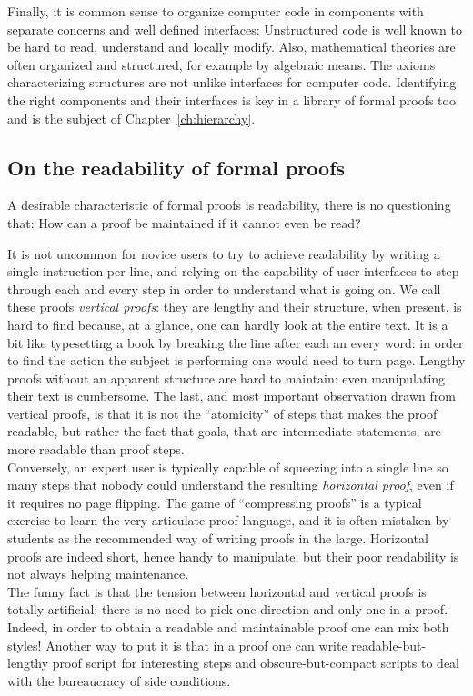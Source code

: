 Finally, it is common sense to organize computer code
in components with separate concerns and well defined interfaces:
Unstructured code is  well known to be hard to read, understand and
locally modify.
Also, mathematical theories are often organized and structured, for
example by algebraic means. The axioms characterizing structures
are not unlike interfaces for computer code.
Identifying the right components and their interfaces is key in a library of
formal proofs too and is the subject of Chapter~\ref{ch:hierarchy}.

\subsection{On the readability of formal proofs}

A desirable characteristic of formal proofs is readability,
there is no questioning that: How can a proof be maintained if
it cannot even be read?

It is not uncommon for novice users to try to achieve readability by
writing a single instruction per line, and relying on the capability
of user interfaces to step through each and every step in order to
understand what is going on. We call these proofs \emph{vertical proofs}:
they are lengthy
and their structure, when present, is hard to find
because, at a glance, one can hardly look at the entire text.
It is a bit like
typesetting a book by breaking the line after each an every word: in
order to find the action the subject is performing one would need to
turn page.  
Lengthy proofs without an apparent structure are hard to
maintain: even manipulating their text is cumbersome. The last, and
most important observation drawn from vertical proofs, is that it is
not the ``atomicity'' of steps that makes the proof readable, but
rather the fact that goals, that are intermediate statements, are
more readable than proof steps. \\
Conversely, an expert \mcbSSR{} user is typically capable of squeezing
into a single line so many steps that nobody could understand the
resulting \emph{horizontal proof}, even if it requires no page flipping.
The game of ``compressing proofs''
is a typical exercise to learn the very articulate \mcbSSR{} proof
language, and it is often
mistaken by students as the recommended way of writing proofs in the
large. Horizontal proofs are indeed short, hence handy to
manipulate, but their poor readability is not always helping maintenance.\\
The funny fact is that the tension between horizontal and vertical
proofs is totally artificial: there is no need to pick one direction and only
one in a proof. Indeed, in order to obtain a readable and maintainable proof
one can mix both styles! Another way to put it is that in a proof one
can write readable-but-lengthy proof script for interesting steps
and obscure-but-compact scripts to deal with the bureaucracy of side conditions.

